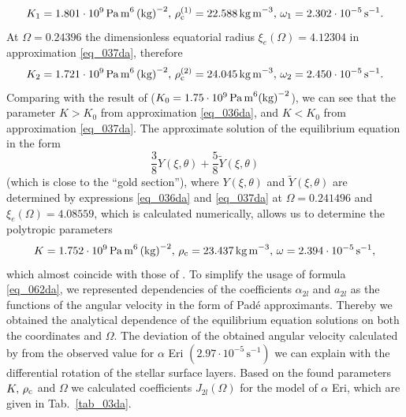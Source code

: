 \documentclass{caosp308}
\begin{document}
\begin{equation}
\label{eq_060da}
K_1=1.801\cdot10^9\,\text{Pa\,m}^6\,\text{(kg)}^{-2},\,
\rho_{\rm c}^{(1)}=22.588\,\text{kg\,m}^{-3},\,
\omega_1=2.302\cdot10^{-5}\,\text{s}^{-1}.
\end{equation}
At $\Omega=0.24396$ the dimensionless equatorial radius $\xi_e(\Omega)=4.12304$ in approximation \eqref{eq_037da}, therefore
\begin{equation}
\label{eq_061da}
K_2=1.721\cdot10^9\,\text{Pa\,m}^6\,\text{(kg)}^{-2},\,
\rho_{\rm c}^{(2)}=24.045\,\text{kg\,m}^{-3},\,
\omega_2=2.450\cdot10^{-5}\,\text{s}^{-1}.
\end{equation}
Comparing with the result of \citet{2015MNRAS.448..456K} ($K_0=1.75\cdot10^9\,\text{Pa\,m}^6\,\newline\text{(kg)}^{-2}$), we can see that the parameter $K>K_0$ from approximation \eqref{eq_036da}, and $K<K_0$ from approximation \eqref{eq_037da}.
The approximate solution of the equilibrium equation in the form
\begin{equation}
\label{eq_062da}
\frac{3}{8}Y(\xi,\theta)+\frac{5}{8}\tilde{Y}(\xi,\theta)
\end{equation}
(which is close to the ``gold section''), where $Y(\xi,\theta)$ and $\tilde{Y}(\xi,\theta)$ are determined by expressions \eqref{eq_036da} and \eqref{eq_037da} at $\Omega=0.241496$ and $\xi_e(\Omega)=4.08559$, which is calculated numerically, allows us to determine the polytropic parameters
\begin{equation}
\label{eq_063da}
K=1.752\cdot10^9\,\text{Pa\,m}^6\,\text{(kg)}^{-2},\,
\rho_{\rm c}=23.437\,\text{kg\,m}^{-3},\,
\omega=2.394\cdot10^{-5}\,\text{s}^{-1},
\end{equation}
which almost coincide with those of \citet{2015MNRAS.448..456K}. To simplify the usage of formula \eqref{eq_062da}, we represented  dependencies of the coefficients $\alpha_{2l}$ and $a_{2l}$ as the functions of the angular velocity in the form of Pad\'e approximants. Thereby we obtained the analytical dependence of the equilibrium equation solutions on both the coordinates and $\Omega$. The deviation of the obtained angular velocity calculated by \citet{2015MNRAS.448..456K} from the observed value for $\alpha$ Eri $(2.97\cdot10^{-5}\,\text{s}^{-1})$ we can explain with the differential rotation of the stellar surface layers. Based on the found parameters $K,\,\rho_{\rm c}$ and $\Omega$ we calculated  coefficients $J_{2l}(\Omega)$ for the model of $\alpha$ Eri, which are given in Tab.~\ref{tab_03da}.
\begin{table}[htb]
{\caption{Coefficients $J_{2l}(\Omega)$ for the model of $\alpha$ Eri for different values of~$l$.
\label{tab_03da}}}
\end{table}
\end{document}

